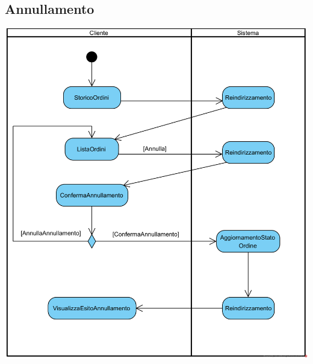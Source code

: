 \documentclass[12pt,a4paper]{article}
\begin{document}
\subsection{Annullamento}
\begin{center}
\includegraphics[width=\textwidth]{ActivityDiagram/AnnullamentoOrdine}
\end{center}
\end{document}
